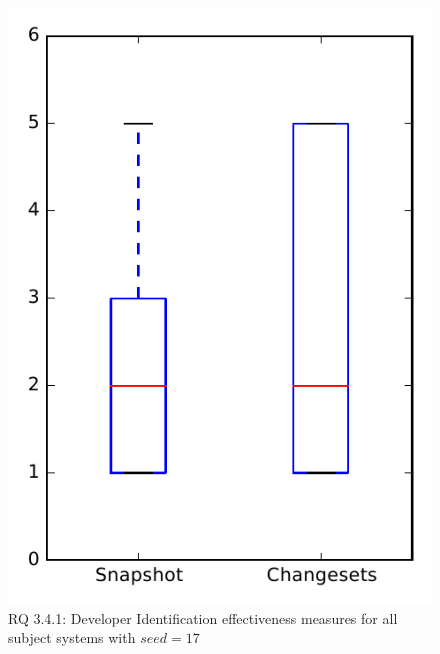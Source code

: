 
\begin{figure}
\centering
\includegraphics[height=0.4\textheight]{figures/dit_seed/rq1_overview_17}
\caption{RQ 3.4.1: Developer Identification effectiveness measures for all subject systems with $seed=17$}
\label{fig:dit_seed:rq1:overview}
\end{figure}
